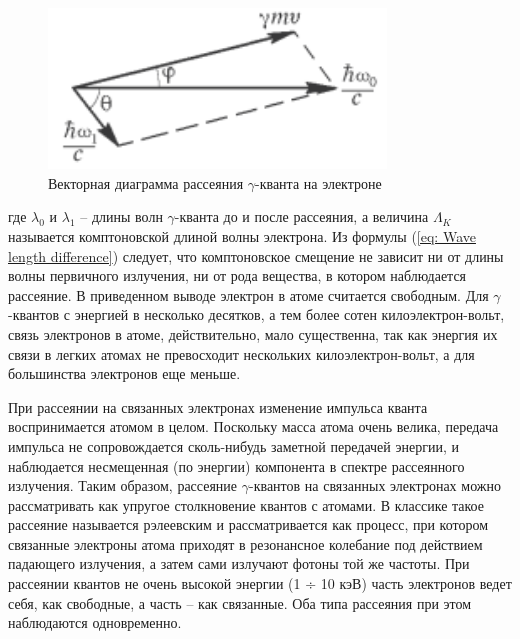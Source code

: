\documentclass[a4paper,12pt]{article}
\begin{document}
\begin{figure}\label{fig: Collision model}
    \begin{center}
    \vspace{-20pt}
        \includegraphics[width = 0.8\textwidth]{Collision model.png}
    \end{center}
    \caption{Векторная диаграмма рассеяния $\gamma$-кванта на электроне}
\end{figure}
где $\lambda_0$ и $\lambda_1$ -- длины волн $\gamma$-кванта до и после рассеяния, а величина $\Lambda_K$ называется комптоновской длиной волны электрона.  Из формулы (\ref{eq: Wave length difference}) следует, что комптоновское смещение не зависит ни от длины волны первичного излучения, ни от рода вещества, в котором наблюдается рассеяние. В приведенном выводе электрон в атоме считается свободным. Для $\gamma$-квантов с энергией в несколько десятков, а тем более сотен килоэлектрон-вольт, связь электронов в атоме, действительно, мало существенна, так как энергия их связи в легких атомах не превосходит нескольких килоэлектрон-вольт, а для большинства электронов еще меньше.

При рассеянии на связанных электронах изменение импульса кванта воспринимается атомом в целом. Поскольку масса атома очень велика, передача импульса не сопровождается сколь-нибудь заметной передачей энергии, и наблюдается несмещенная (по энергии) компонента в спектре рассеянного излучения. Таким образом, рассеяние
$\gamma$-квантов на связанных электронах можно рассматривать как упругое столкновение квантов с атомами. В классике такое рассеяние называется рэлеевским и рассматривается как процесс, при котором связанные
электроны атома приходят в резонансное колебание под действием падающего излучения, а затем сами излучают фотоны той же частоты. При рассеянии квантов не очень высокой энергии (1 ÷ 10 кэВ) часть электронов ведет себя, как свободные, а часть -- как связанные. Оба типа рассеяния при этом наблюдаются одновременно.
\end{document}
